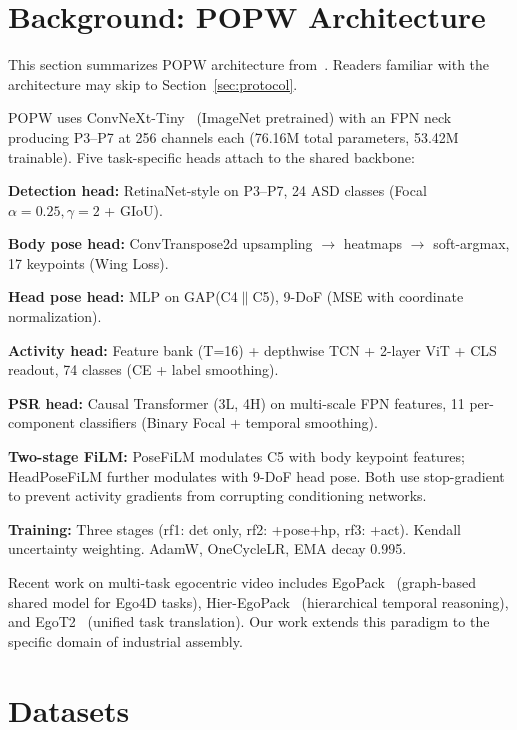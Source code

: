 \documentclass[10pt,journal,compsoc]{IEEEtran}
\newcommand{\popw}{POPW}
\begin{document}
\FloatBarrier

\section{Background: \popw{} Architecture}
\label{sec:background}

This section summarizes \popw{} architecture from~\cite{popw2026}. Readers familiar with the architecture may skip to Section~\ref{sec:protocol}.

\popw{} uses ConvNeXt-Tiny~\cite{liu2022convnet} (ImageNet pretrained) with an FPN neck producing P3--P7 at 256 channels each (76.16M total parameters, 53.42M trainable). Five task-specific heads attach to the shared backbone:

\textbf{Detection head:} RetinaNet-style on P3--P7, 24 ASD classes (Focal $\alpha{=}0.25,\gamma{=}2$ + GIoU).

\textbf{Body pose head:} ConvTranspose2d upsampling $\rightarrow$ heatmaps $\rightarrow$ soft-argmax, 17 keypoints (Wing Loss).

\textbf{Head pose head:} MLP on GAP(C4$\|$C5), 9-DoF (MSE with coordinate normalization).

\textbf{Activity head:} Feature bank (T=16) + depthwise TCN + 2-layer ViT + CLS readout, 74 classes (CE + label smoothing).

\textbf{PSR head:} Causal Transformer (3L, 4H) on multi-scale FPN features, 11 per-component classifiers (Binary Focal + temporal smoothing).

\textbf{Two-stage FiLM:} PoseFiLM modulates C5 with body keypoint features; HeadPoseFiLM further modulates with 9-DoF head pose. Both use stop-gradient to prevent activity gradients from corrupting conditioning networks.

\textbf{Training:} Three stages (rf1: det only, rf2: +pose+hp, rf3: +act). Kendall uncertainty weighting. AdamW, OneCycleLR, EMA decay 0.995.


Recent work on multi-task egocentric video includes EgoPack~\cite{peirone2024egopack} (graph-based shared model for Ego4D tasks), Hier-EgoPack~\cite{peirone2026hieregopack} (hierarchical temporal reasoning), and EgoT2~\cite{xue2023egot2} (unified task translation). Our work extends this paradigm to the specific domain of industrial assembly.
\FloatBarrier

\section{Datasets}
\label{sec:datasets}
\end{document}
